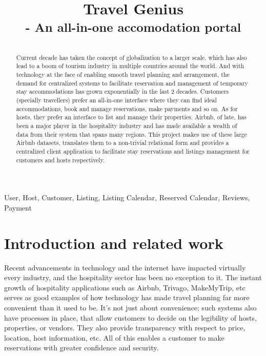 \documentclass[conference]{IEEEtran}
\begin{document}
\title{
    Travel Genius\\
    { \textsuperscript{- An all-in-one accomodation portal}}
}

\author{
\and
{}
}

\maketitle


\vspace{-20mm}

\begin{abstract}
    Current decade has taken the concept of globalization to a larger scale, which has also lead to a boom of tourism industry in multiple countries around the world. And with technology at the face of enabling smooth travel planning and arrangement, the demand for centralized systems to facilitate reservation and management of temporary stay accommodations has grown exponentially in the last 2 decades. Customers (specially travellers) prefer an all-in-one interface where they can find ideal accommodations, book and manage reservations, make payments and so on. As for hosts, they prefer an interface to list and manage their properties.  Airbnb, of late, has been a major player in the hospitality industry and has made available a wealth of data from their system that spans many regions. This project makes use of these large Airbnb datasets, translates them to a non-trivial relational form and provides a centralized client application to facilitate stay reservations and listings management for customers and hosts respectively.
\end{abstract}

\begin{IEEEkeywords}
    User, Host, Customer, Listing, Listing Calendar, Reserved Calendar, Reviews, Payment
\end{IEEEkeywords}

\section{\textbf{Introduction and related work}}
    Recent advancements in technology and the internet have impacted virtually every industry, and the hospitality sector has been no exception to it. The instant growth of hospitality applications such as Airbnb, Trivago, MakeMyTrip, etc serves as good examples of how technology has made travel planning far more convenient than it used to be. It’s not just about convenience; such systems also have processes in place, that allow customers to decide on the legibility of hosts, properties, or vendors. They also provide transparency with respect to price, location, host information, etc. All of this enables a customer to make reservations with greater confidence and security.
\end{document}
